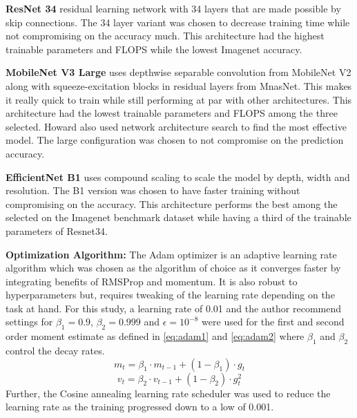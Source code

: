 \documentclass[10pt,twocolumn,letterpaper]{article}
\begin{document}
\textbf{ResNet 34} residual learning network with 34 layers that are made possible by skip 
connections. The 34 layer variant was chosen to decrease training time while not compromising on 
the accuracy much. This architecture had the highest trainable parameters and FLOPS while the lowest 
Imagenet accuracy.
\cite{he2016deep}

\textbf{MobileNet V3 Large} uses depthwise separable convolution from MobileNet V2 along with 
squeeze-excitation blocks in residual layers 
from MnasNet. This makes it really quick to train while still performing 
at par with other architectures. This architecture had the lowest trainable parameters and FLOPS 
among the three selected. Howard \etal \cite{howard2019searching} also used 
network architecture search to find the most effective model. The large configuration 
was chosen to not compromise on the prediction accuracy.

\textbf{EfficientNet B1} uses compound scaling to scale the model by depth, width and 
resolution. The B1 version was chosen to have faster training without compromising on the 
accuracy. \cite{tan2019efficientnet} This architecture performs the best among the selected 
on the Imagenet benchmark dataset while having a third of the trainable parameters of Resnet34.

\textbf{Optimization Algorithm:}
The Adam optimizer \cite{kingma2014adam} is an adaptive learning rate algorithm which 
was chosen as the algorithm of choice as it converges faster by integrating benefits of  
RMSProp and momentum. It is also robust to hyperparameters but, 
requires tweaking of the learning rate depending on the task at hand. For this study, 
a learning rate of 0.01 and the author recommend settings for $\beta_{1} =
0.9$, $\beta_{2} = 0.999$ and $\epsilon = 10^{-8}$ were used for the first and second order moment estimate 
as defined in \cref{eq:adam1} and \cref{eq:adam2} where $\beta_{1}$ and $\beta_{2}$ control the decay rates.
\begin{equation}
m_{t} = \beta_{1} \cdot m_{t-1} + (1 - \beta_{1}) \cdot g_{t}
\label{eq:adam1}
\end{equation}
\begin{equation}
  v_{t} = \beta_{2} \cdot v_{t-1} + (1 - \beta_{2}) \cdot g_{t}^{2}
  \label{eq:adam2}
  \end{equation}
Further, the Cosine annealing \cite{loshchilov2016sgdr} learning rate scheduler was used 
to reduce the learning rate as the training progressed down to a low of 0.001. 
\end{document}
